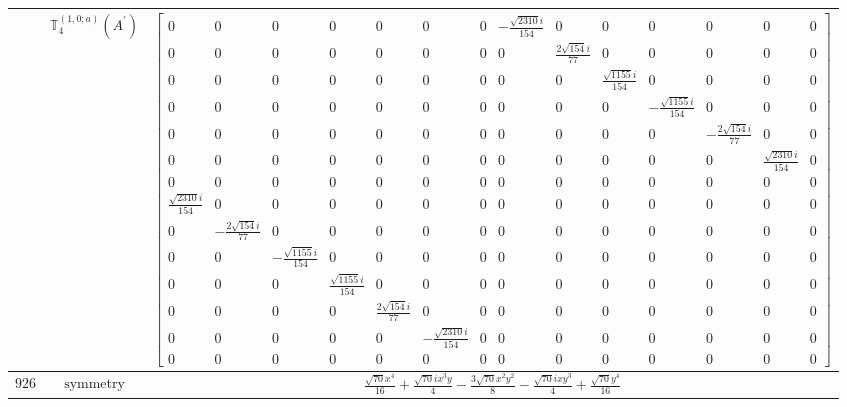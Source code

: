 \documentclass[fleqn,8pt,landscape]{jsarticle}
\begin{document}
\begin{longtable}{ccc}
$  $ & $ \mathbb{T}_{4}^{(1,0;a)}(A^{\prime}) $ & $ \begin{bmatrix} 0 & 0 & 0 & 0 & 0 & 0 & 0 & - \frac{\sqrt{2310} i}{154} & 0 & 0 & 0 & 0 & 0 & 0 \\ 0 & 0 & 0 & 0 & 0 & 0 & 0 & 0 & \frac{2 \sqrt{154} i}{77} & 0 & 0 & 0 & 0 & 0 \\ 0 & 0 & 0 & 0 & 0 & 0 & 0 & 0 & 0 & \frac{\sqrt{1155} i}{154} & 0 & 0 & 0 & 0 \\ 0 & 0 & 0 & 0 & 0 & 0 & 0 & 0 & 0 & 0 & - \frac{\sqrt{1155} i}{154} & 0 & 0 & 0 \\ 0 & 0 & 0 & 0 & 0 & 0 & 0 & 0 & 0 & 0 & 0 & - \frac{2 \sqrt{154} i}{77} & 0 & 0 \\ 0 & 0 & 0 & 0 & 0 & 0 & 0 & 0 & 0 & 0 & 0 & 0 & \frac{\sqrt{2310} i}{154} & 0 \\ 0 & 0 & 0 & 0 & 0 & 0 & 0 & 0 & 0 & 0 & 0 & 0 & 0 & 0 \\ \frac{\sqrt{2310} i}{154} & 0 & 0 & 0 & 0 & 0 & 0 & 0 & 0 & 0 & 0 & 0 & 0 & 0 \\ 0 & - \frac{2 \sqrt{154} i}{77} & 0 & 0 & 0 & 0 & 0 & 0 & 0 & 0 & 0 & 0 & 0 & 0 \\ 0 & 0 & - \frac{\sqrt{1155} i}{154} & 0 & 0 & 0 & 0 & 0 & 0 & 0 & 0 & 0 & 0 & 0 \\ 0 & 0 & 0 & \frac{\sqrt{1155} i}{154} & 0 & 0 & 0 & 0 & 0 & 0 & 0 & 0 & 0 & 0 \\ 0 & 0 & 0 & 0 & \frac{2 \sqrt{154} i}{77} & 0 & 0 & 0 & 0 & 0 & 0 & 0 & 0 & 0 \\ 0 & 0 & 0 & 0 & 0 & - \frac{\sqrt{2310} i}{154} & 0 & 0 & 0 & 0 & 0 & 0 & 0 & 0 \\ 0 & 0 & 0 & 0 & 0 & 0 & 0 & 0 & 0 & 0 & 0 & 0 & 0 & 0 \end{bmatrix} $ \\ \hline
$ 926 $ & $ \text{symmetry} $ & $ \frac{\sqrt{70} x^{4}}{16} + \frac{\sqrt{70} i x^{3} y}{4} - \frac{3 \sqrt{70} x^{2} y^{2}}{8} - \frac{\sqrt{70} i x y^{3}}{4} + \frac{\sqrt{70} y^{4}}{16} $ \\

\end{longtable}
\end{document}
